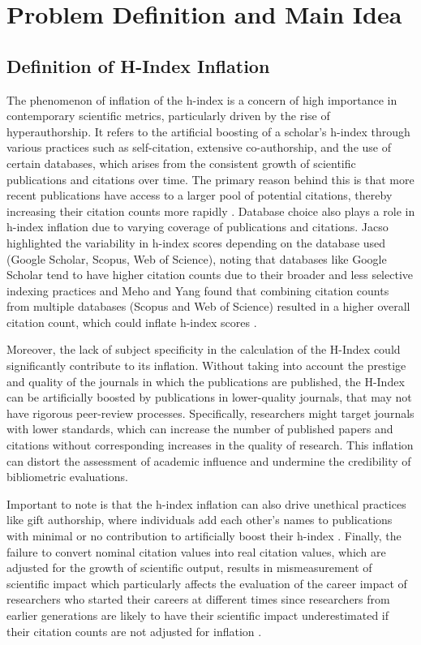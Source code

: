 \chapter{Problem Definition and Main Idea}
\label{ch:problem}

\section{Definition of H-Index Inflation}
The phenomenon of inflation of the h-index is a concern of high importance in
contemporary scientific metrics, particularly driven by the rise of
hyperauthorship. It refers to the artificial boosting of a scholar's h-index
through various practices such as self-citation, extensive co-authorship, and
the use of certain databases, which arises from the consistent growth of
scientific publications and citations over time. The primary reason behind this
is that more recent publications have access to a larger pool of potential
citations, thereby increasing their citation counts more rapidly
\cite{norris2010h, koltun2021h, bi2023four}. Database choice also plays a role
in h-index inflation due to varying coverage of publications and citations.
Jacso highlighted the variability in h-index scores depending on the database
used (Google Scholar, Scopus, Web of Science), noting that databases like
Google Scholar tend to have higher citation counts due to their broader and
less selective indexing practices and Meho and Yang found that combining
citation counts from multiple databases (Scopus and Web of Science) resulted in
a higher overall citation count, which could inflate h-index scores
\cite{norris2010h}.

Moreover, the lack of subject specificity in the calculation of the H-Index
could significantly contribute to its inflation. Without taking into account
the prestige and quality of the journals in which the publications are
published, the H-Index can be artificially boosted by publications in
lower-quality journals, that may not have rigorous peer-review processes.
Specifically, researchers might target journals with lower standards, which can
increase the number of published papers and citations without corresponding
increases in the quality of research. This inflation can distort the assessment
of academic influence and undermine the credibility of bibliometric
evaluations.

Important to note is that the h-index inflation can also drive unethical
practices like gift authorship, where individuals add each other’s names to
publications with minimal or no contribution to artificially boost their
h-index \cite{bi2023four}. Finally, the failure to convert nominal citation
values into real citation values, which are adjusted for the growth of
scientific output, results in mismeasurement of scientific impact which
particularly affects the evaluation of the career impact of researchers who
started their careers at different times since researchers from earlier
generations are likely to have their scientific impact underestimated if their
citation counts are not adjusted for inflation \cite{petersen2019methods}.

